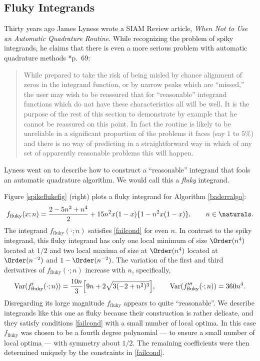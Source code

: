 \documentclass[]{article}
\DeclareMathOperator{\Var}{Var}
\theoremstyle{definition}
\theoremstyle{remark}
\begin{document}
\subsection{Fluky Integrands} \label{flukysubsec}

Thirty years ago James Lyness wrote a SIAM Review article, \emph{When Not to Use an Automatic Quadrature Routine}.  While recognizing the problem of spiky integrands, he claims that there is even a more serious problem with automatic quadrature methods   \cite{Lyn83}*{p.\ 69}:
\begin{quote}
While prepared to take the risk of being misled by chance alignment of zeros in the integrand function, or by narrow peaks which are ``missed,'' the user may wish to be reassured that for ``reasonable'' integrand functions which do not have these characteristics all will be well. It is the purpose of the rest of this section to demonstrate by example that he cannot be reassured on this point. In fact the routine is likely to be unreliable in a significant proportion of the problems it faces (say $1$ to $5\%$) and there is no way of predicting in a straightforward way in which of any set of apparently reasonable problems this will happen.
\end{quote}
Lyness went on to describe how to construct a ``reasonable'' integrand that fools an automatic quadrature algorithm.  We would call this a \emph{fluky} integrand.  

Figure \ref{spikeflukefig} (right) plots a fluky integrand for Algorithm \ref{baderralgo}:
\begin{equation} \label{fluky}
f_{\text{fluky}}(x;n) = \frac{2 - 5 n^2 + n^4}{2}+ 15n^2 x(1-x)\{1 - n^2 x(1-x)\}, \qquad n \in \naturals.
\end{equation}
The integrand $f_{\text{fluky}}(\cdot;n)$ satisfies \eqref{failcond} for even $n$.   In contrast to the spiky integrand, this fluky integrand has only one local minimum of size $\Order(n^4)$ located at $1/2$ and two local maxima of size at $\Order(n^4)$ located at $\Order(n^{-2})$ and $1-\Order(n^{-2})$.  The variation of the first and third derivatives of $f_{\text{fluky}}(\cdot;n)$ increase with $n$, specifically,
\begin{equation*}
\Var(f'_{\text{fluky}}(\cdot;n))= \frac{10 n}{3}  \Bigl[9 n + 2 \sqrt{3(-2 + n^2)^3} \Bigr ], \qquad
\Var(f'''_{\text{fluky}}(\cdot;n))= 360n^4.
\end{equation*}
Disregarding its large magnitude $f_{\text{fluky}}$ appears to quite ``reasonable''.  We describe integrands like this one as fluky because their construction is rather delicate, and they satisfy conditions \eqref{failcond} with a small number of local optima.  In this case $f_{\text{fluky}}$ was chosen to be a fourth degree polynomial --- to ensure a small number of local optima --- with symmetry about $1/2$.  The remaining coefficients were then determined uniquely by the constraints in \eqref{failcond}.  
\end{document}
